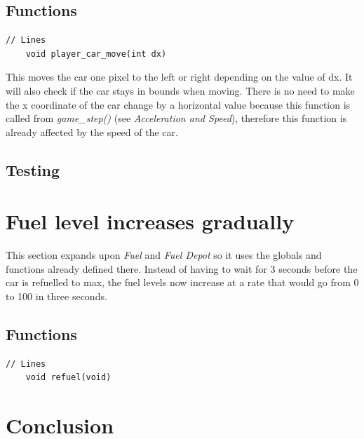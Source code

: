 \documentclass{article}
\begin{document}
\subsection*{Functions}
\begin{lstlisting}[style=CStyle]
	// Lines
	void player_car_move(int dx)
\end{lstlisting}
This moves the car one pixel to the left or right depending on the value of dx. It will also check if the car stays in bounds when moving. There is no need to make the x coordinate of the car change by a horizontal value because this function is called from \emph{game\_step()} (see \emph{Acceleration and Speed}), therefore this function is already affected by the speed of the car.
\newline

\subsection*{Testing}

\clearpage

\section{Fuel level increases gradually}
This section expands upon \emph{Fuel} and \emph{Fuel Depot}  so it uses the globals and functions already defined there. Instead of having to wait for 3 seconds before the car is refuelled to max, the fuel levels now increase at a rate that would go from 0 to 100 in three seconds.  

\subsection*{Functions}
\begin{lstlisting}[style=CStyle]
	// Lines
	void refuel(void)
\end{lstlisting}

\clearpage

\section{Conclusion}
\end{document}
